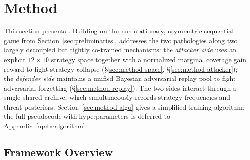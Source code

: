 \section{Method}
\label{sec:method}

This section presents \method. Building on the non-stationary, asymmetric-sequential game from Section~\ref{sec:preliminaries}, \method addresses the two pathologies along two largely decoupled but tightly co-trained mechanisms: the \emph{attacker side} uses an explicit $12\times10$ strategy space together with a normalized marginal coverage gain reward to fight strategy collapse (\S\ref{sec:method-space}, \S\ref{sec:method-attacker}); the \emph{defender side} maintains a unified Bayesian adversarial replay pool to fight adversarial forgetting (\S\ref{sec:method-replay}). The two sides interact through a single shared archive, which simultaneously records strategy frequencies and threat posteriors. Section~\ref{sec:method-algo} gives a simplified training algorithm; the full pseudocode with hyperparameters is deferred to Appendix~\ref{apdx:algorithm}.

\subsection{Framework Overview}
\label{sec:method-overview}

